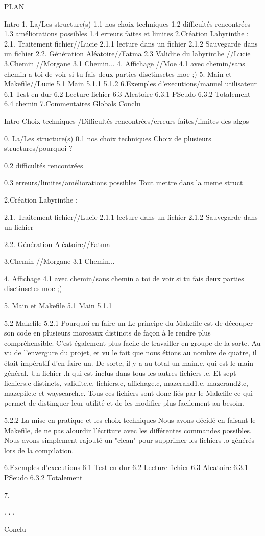 PLAN

Intro
1. La/Les  structure(s)
  1.1 nos choix techniques
  1.2 difficultés rencontrées
  1.3 améliorations possibles
  1.4 erreurs faites et limites
2.Création Labyrinthe :
  2.1. Traitement fichier//Lucie
    2.1.1 lecture dans un fichier
    2.1.2 Sauvegarde dans un fichier
  2.2. Génération Aléatoire//Fatma
  2.3 Validite du labyrinthe //Lucie
3.Chemin //Morgane
  3.1 Chemin...
4. Affichage //Moe
  4.1 avec chemin/sans chemin a toi de voir si tu fais deux parties disctinsctes moe ;)
5. Main et Makefile//Lucie
  5.1 Main
    5.1.1
    5.1.2
6.Exemples d'executions/manuel utilisateur
  6.1 Test en dur
  6.2 Lecture fichier
  6.3 Aleatoire
    6.3.1 PSeudo
    6.3.2 Totalement
  6.4 chemin
7.Commentaires Globals
Conclu






Intro
Choix techniques /Difficultés rencontrées/erreurs faites/limites des algos


0. La/Les  structure(s)
0.1 nos choix techniques
  Choix de plusieurs structures/pourquoi ?
  
0.2 difficultés rencontrées
  
0.3 erreurs/limites/améliorations possibles
Tout mettre dans la meme struct


2.Création Labyrinthe :

2.1. Traitement fichier//Lucie
2.1.1 lecture dans un fichier
2.1.2 Sauvegarde dans un fichier

2.2. Génération Aléatoire//Fatma

3.Chemin //Morgane
3.1 Chemin...

4. Affichage 
4.1 avec chemin/sans chemin a toi de voir si tu fais deux parties disctinsctes moe ;)

5. Main et Makefile
5.1 Main
5.1.1



5.2 Makefile
5.2.1 Pourquoi en faire un
Le principe du Makefile est de découper son code en plusieurs morceaux distincts de façon à le rendre plus compréhensible.
C'est également plus facile de travailler en groupe de la sorte. 
Au vu de l'envergure du projet, et vu le fait que nous étions au nombre de quatre, il était impératif d'en faire un. 
De sorte, il y a au total un main.c, qui est le main général. Un fichier .h qui est inclus dans tous les autres fichiers .c.  
Et sept fichiers.c distincts, validite.c, fichiers.c, affichage.c, mazerand1.c, mazerand2.c, mazepile.c et waysearch.c.
Tous ces fichiers sont donc liés par le Makefile ce qui permet de distinguer leur utilité et de les modifier plus facilement au besoin.

5.2.2 La mise en pratique et les choix techniques
Nous avons décidé en faisant le Makefile, de ne pas alourdir l'écriture avec les différentes commandes possibles.
Nous avons simplement rajouté un "clean" pour supprimer les fichiers .o générés lors de la compilation. 



6.Exemples d'executions
6.1 Test en dur
6.2 Lecture fichier
6.3 Aleatoire
6.3.1 PSeudo
6.3.2 Totalement

7.


.
.
.

Conclu

